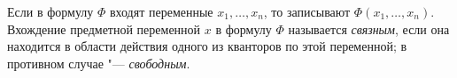 \begin{definition}
    Если в формулу $\Phi$ входят переменные $x_1,\ldots,x_n$, то записывают $\Phi(x_1,\ldots,x_n)$. Вхождение предметной переменной $x$ в формулу $\Phi$ называется \textit{связным}, если она находится в области действия одного из кванторов по этой переменной; в противном случае "--- \textit{свободным}.
\end{definition}
